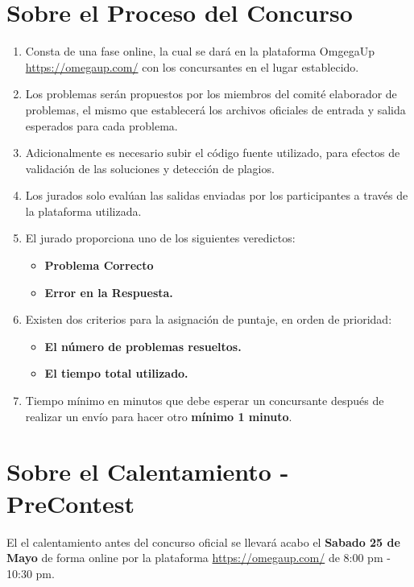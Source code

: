 \documentclass{article}
\begin{document}
\begin{itemize}
          \section{Sobre el Proceso del Concurso}
          \begin{enumerate}
              \item Consta de una fase online, la cual se dará en la plataforma OmgegaUp \url{https://omegaup.com/} con los concursantes en el lugar establecido.
              \item Los problemas serán propuestos por los miembros del comité elaborador de problemas, el mismo que establecerá los archivos oficiales de entrada y salida esperados para cada problema.
              \item Adicionalmente es necesario subir el código fuente utilizado, para efectos de
                    validación de las soluciones y detección de plagios.
              \item Los jurados solo evalúan las salidas enviadas por los participantes a través
                    de la plataforma utilizada.
              \item El jurado proporciona uno de los siguientes veredictos:
                    \begin{itemize}
                        \item \textbf{Problema Correcto}
                        \item \textbf{Error en la Respuesta.}
                    \end{itemize}
              \item Existen dos criterios para la asignación de puntaje, en orden de prioridad:
                    \begin{itemize}
                        \item \textbf{El número de problemas resueltos.}
                        \item \textbf{El tiempo total utilizado.}
                    \end{itemize}
              \item Tiempo mínimo en minutos que debe esperar un concursante después de realizar un envío para hacer otro \textbf{mínimo 1 minuto}.
          \end{enumerate}
          \section{Sobre el Calentamiento - PreContest}
          El el calentamiento antes del concurso oficial se llevará acabo el \textbf{Sabado 25 de Mayo} de forma online por la plataforma \url{https://omegaup.com/} de 8:00 pm - 10:30 pm.

\end{itemize}
\end{document}
